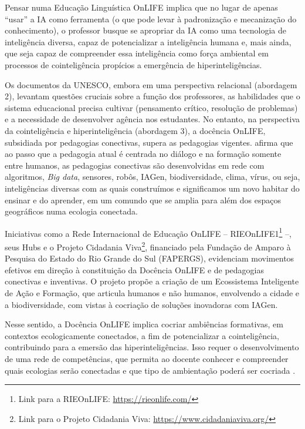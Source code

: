 \documentclass[portuguese]{textolivre}
\begin{document}
Pensar numa Educação Linguística OnLIFE implica que no lugar de apenas “usar” a IA como ferramenta (o que pode levar à padronização e mecanização do conhecimento), o professor busque se apropriar da IA como uma tecnologia de inteligência diversa, capaz de potencializar a inteligência humana e, mais ainda, que seja capaz de compreender essa inteligência como força ambiental em processos de cointeligência propícios a emergência de hiperinteligências.

Os documentos da UNESCO, embora em uma perspectiva relacional (abordagem 2), levantam questões cruciais sobre a função dos professores, as habilidades que o sistema educacional precisa cultivar (pensamento crítico, resolução de problemas) e a necessidade de desenvolver agência nos estudantes. No entanto, na perspectiva da cointeligência e hiperinteligência (abordagem 3), a docência OnLIFE, subsidiada por pedagogias conectivas, supera as pedagogias vigentes. \textcite{schlemmer2023protagonismo} afirma que ao passo que a pedagogia atual é centrada no diálogo e na formação somente entre humanos, as pedagogias conectivas são desenvolvidas em rede com algoritmos, \textit{Big data}, sensores, robôs, IAGen, biodiversidade, clima, vírus, ou seja, inteligências diversas com as quais construímos e significamos um novo habitar do ensinar e do aprender, em um comundo que se amplia para além dos espaços geográficos numa ecologia conectada.

Iniciativas como a Rede Internacional de Educação OnLIFE – RIEOnLIFE1\footnote{Link para a RIEOnLIFE: \url{https://rieonlife.com/}} --, seus Hubs e o Projeto Cidadania Viva\footnote{Link para o Projeto Cidadania Viva: \url{https://www.cidadaniaviva.org/}}, financiado pela Fundação de Amparo à Pesquisa do Estado do Rio Grande do Sul (FAPERGS), evidenciam movimentos efetivos em direção à constituição da Docência OnLIFE e de pedagogias conectivas e inventivas. O projeto propõe a criação de um Ecossistema Inteligente de Ação e Formação, que articula humanos e não humanos, envolvendo a cidade e a biodiversidade, com vistas à cocriação de soluções inovadoras com IAGen.

Nesse sentido, a Docência OnLIFE implica cocriar ambiências formativas, em contextos ecologicamente conectados, a fim de potencializar a cointeligência, contribuindo para a emersão das hiperinteligências. Isso requer o desenvolvimento de uma rede de competências, que permita ao docente conhecer e compreender quais ecologias serão conectadas e que tipo de ambientação poderá ser cocriada \cite{schlemmer2023protagonismo}.
\end{document}
